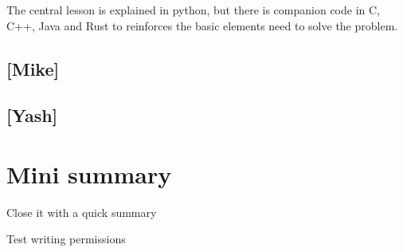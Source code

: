 The central lesson is explained in python, but there is companion code in C, C++, Java and Rust to reinforces the basic elements need to solve the problem.

\subsection{[Mike]}

\subsection{[Yash]}


\section{Mini summary}
Close it with a quick summary

Test writing permissions
